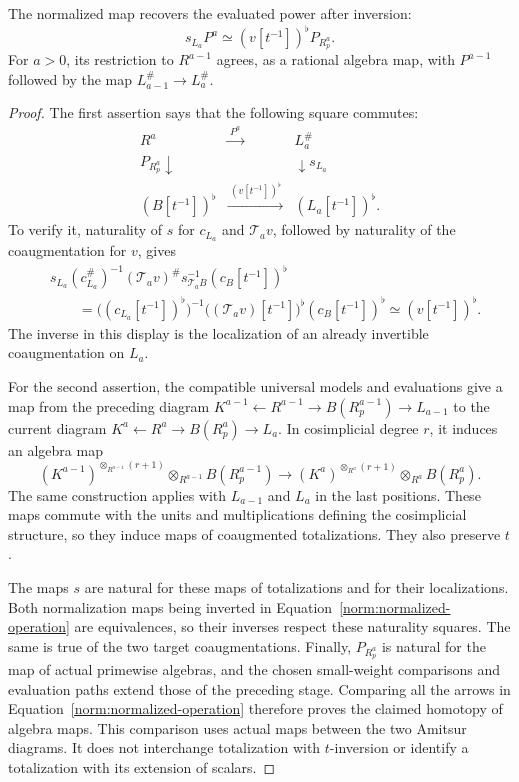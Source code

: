 \begin{lemma}
\label{norm:naturality}
The normalized map recovers the evaluated power after inversion:
\begin{equation}
\label{norm:raw-recovery}
 s_{L_a}P^a\simeq (v[t^{-1}])^\flat P_{R_p^a}.
\end{equation}
For $a>0$, its restriction to $R^{a-1}$ agrees, as a rational
algebra map, with $P^{a-1}$ followed by the map $L_{a-1}^\#\to
L_a^\#$.
\end{lemma}

\begin{proof}
The first assertion says that the following square commutes:
\[
\begin{array}{ccc}
 R^a&\xrightarrow{\ P^a\ }&L_a^\#\\[2pt]
 {\scriptstyle P_{R_p^a}}\downarrow&&
       \downarrow{\scriptstyle s_{L_a}}\\[2pt]
 (B[t^{-1}])^\flat&\xrightarrow{\ (v[t^{-1}])^\flat\ }&
       (L_a[t^{-1}])^\flat .
\end{array}
\]
To verify it, naturality of $s$ for $c_{L_a}$ and $\mathcal T_a v$,
followed by naturality of the coaugmentation for $v$, gives
\[
\begin{aligned}
 &s_{L_a}(c_{L_a}^\#)^{-1}(\mathcal T_a v)^\#
        s_{\mathcal T_a B}^{-1}(c_B[t^{-1}])^\flat\\
 &\qquad=\bigl((c_{L_a}[t^{-1}])^\flat\bigr)^{-1}
       \bigl((\mathcal T_a v)[t^{-1}]\bigr)^\flat
       (c_B[t^{-1}])^\flat
   \simeq (v[t^{-1}])^\flat.
\end{aligned}
\]
The inverse in this display is the localization of an already
invertible coaugmentation on $L_a$.

For the second assertion, the compatible universal models and
evaluations give a map from the preceding diagram
$K^{a-1}\leftarrow R^{a-1}\to B(R_p^{a-1})\to L_{a-1}$
to the current diagram $K^a\leftarrow R^a\to B(R_p^a)\to L_a$.
In cosimplicial degree $r$, it induces an algebra map
\[
 (K^{a-1})^{\otimes_{R^{a-1}}(r+1)}
       \otimes_{R^{a-1}}B(R_p^{a-1})
 \longrightarrow
 (K^a)^{\otimes_{R^a}(r+1)}\otimes_{R^a}B(R_p^a).
\]
The same construction applies with $L_{a-1}$ and $L_a$ in the last
positions.  These maps commute with the units and multiplications
defining the cosimplicial structure, so they induce maps of
coaugmented totalizations.  They also preserve $t$.

The maps $s$ are natural for these maps of totalizations and for their
localizations.  Both normalization maps being inverted in
Equation~\eqref{norm:normalized-operation} are equivalences, so
their inverses respect these naturality squares.  The same is true
of the two target coaugmentations.  Finally, $P_{R_p^a}$ is natural
for the map of actual primewise algebras, and the chosen small-weight
comparisons and evaluation paths extend those of the preceding
stage.  Comparing all the arrows in
Equation~\eqref{norm:normalized-operation} therefore proves the
claimed homotopy of algebra maps.  This comparison uses actual maps
between the two Amitsur diagrams.  It does not interchange
totalization with $t$-inversion or identify a totalization with its
extension of scalars.
\end{proof}

